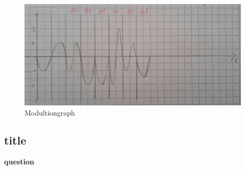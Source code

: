 \documentclass[a4paper,12pt]{article}
\begin{document}
    \begin{figure}[h!] 
        \includegraphics[width=1\linewidth]{mod_solution2.png} 
	    \caption{Modultiongraph}
    \end{figure}
	
	
	\subsection{title}
	\textbf{question}
	
	
\end{document}

